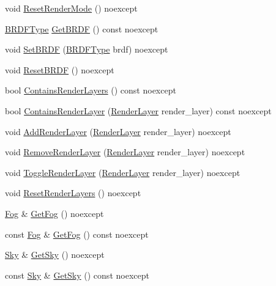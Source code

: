 \begin{DoxyCompactItemize}
\item 
void \hyperlink{classmage_1_1_camera_settings_aa8facc0ddcd3e3d9f3c05c9f44c77b5d}{Reset\+Render\+Mode} () noexcept
\item 
\hyperlink{namespacemage_af1044f87544bc38427766a8c795d2f26}{B\+R\+D\+F\+Type} \hyperlink{classmage_1_1_camera_settings_a31504f7e9b23404ee1b200561b8dd789}{Get\+B\+R\+DF} () const noexcept
\item 
void \hyperlink{classmage_1_1_camera_settings_a8fbc3d6013d5f711decaf6f7348f2e15}{Set\+B\+R\+DF} (\hyperlink{namespacemage_af1044f87544bc38427766a8c795d2f26}{B\+R\+D\+F\+Type} brdf) noexcept
\item 
void \hyperlink{classmage_1_1_camera_settings_a1f8b3952282d153db4fb6416e9d933b7}{Reset\+B\+R\+DF} () noexcept
\item 
bool \hyperlink{classmage_1_1_camera_settings_a696cbb2a11f4f8f4a8ab444c62ed46fd}{Contains\+Render\+Layers} () const noexcept
\item 
bool \hyperlink{classmage_1_1_camera_settings_a9b5fd1fba981f92796d9b366cfba0023}{Contains\+Render\+Layer} (\hyperlink{namespacemage_a4091cc4d4d64a0fd31fd96c2ef7af761}{Render\+Layer} render\+\_\+layer) const noexcept
\item 
void \hyperlink{classmage_1_1_camera_settings_ab1dca8b8f52daf55614592e0bb640ae9}{Add\+Render\+Layer} (\hyperlink{namespacemage_a4091cc4d4d64a0fd31fd96c2ef7af761}{Render\+Layer} render\+\_\+layer) noexcept
\item 
void \hyperlink{classmage_1_1_camera_settings_a358ab9da30af67ca8b1ea2a5eb5a2710}{Remove\+Render\+Layer} (\hyperlink{namespacemage_a4091cc4d4d64a0fd31fd96c2ef7af761}{Render\+Layer} render\+\_\+layer) noexcept
\item 
void \hyperlink{classmage_1_1_camera_settings_a47c34af7eddc2a0f6256d137b5813a4c}{Toggle\+Render\+Layer} (\hyperlink{namespacemage_a4091cc4d4d64a0fd31fd96c2ef7af761}{Render\+Layer} render\+\_\+layer) noexcept
\item 
void \hyperlink{classmage_1_1_camera_settings_afc9bcdb1f27adfb1c69a668a24113b46}{Reset\+Render\+Layers} () noexcept
\item 
\hyperlink{classmage_1_1_fog}{Fog} \& \hyperlink{classmage_1_1_camera_settings_ae1ba03a765f304703502bcd7de15d436}{Get\+Fog} () noexcept
\item 
const \hyperlink{classmage_1_1_fog}{Fog} \& \hyperlink{classmage_1_1_camera_settings_a84098b0518f7eada941944b8155372a8}{Get\+Fog} () const noexcept
\item 
\hyperlink{classmage_1_1_sky}{Sky} \& \hyperlink{classmage_1_1_camera_settings_add70e097b67b2a181eb61b2b8f1263e0}{Get\+Sky} () noexcept
\item 
const \hyperlink{classmage_1_1_sky}{Sky} \& \hyperlink{classmage_1_1_camera_settings_a538464550850914bc531ba7b12515ce1}{Get\+Sky} () const noexcept
\end{DoxyCompactItemize}

